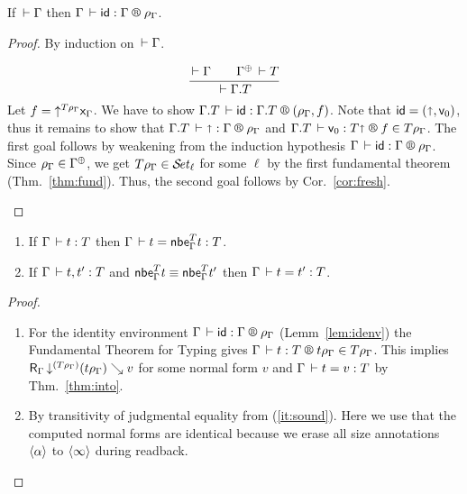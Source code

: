 \documentclass[acmlarge,review,anonymous]{acmart}\settopmatter{printfolios=true}
\begin{document}
\begin{lemma}
  \label{lem:idenv}
  If $\der \Gamma$ then
  $\LRS \Gamma \sid \Gamma \rhog$.
\end{lemma}
\begin{proof}
  By induction on $\der \Gamma$.
\begin{caselist}

\nextcase
\[
  \ru{\der \Gamma \qquad \resurrect\Gamma \der T
    }{\der \cext \Gamma T}
\]
Let $f = \up{T\rhog} \var\Gamma$.
We have to show $\LRS{\cext \Gamma T} \sid {\cext\Gamma T} {(\rhog, f)}$.
Note that $\sid = (\slift,\ind0)$, thus it remains to show that
$\LRS {\cext \Gamma T} {\slift} \Gamma \rhog$ and
$\LR {\cext \Gamma T} {\ind0} {T\slift} f {T\rhog}$.
The first goal follows by weakening from the induction hypothesis
$\LRS \Gamma \sid \Gamma \rhog$.
Since $\rhog \in \resurrect\Gamma$, we get $T \rhog \in \SET[\ell]$ for some $\ell$
by the first fundamental theorem (Thm.~\ref{thm:fund}).
Thus, the second goal follows by Cor.~\ref{cor:fresh}.

\nextcase


\end{caselist}
\end{proof}

\begin{corollary}
  \label{cor:soundnbe} \bla
  \begin{enumerate}
  \item \label{it:sound}
  If\/ $\Gamma \der t : T$ then $\Gamma \der t = \nbe \Gamma T t : T$.
  \item
  If\/ $\Gamma \der t,t' : T$ and $\nbe \Gamma T t \equiv \nbe \Gamma T {t'}$ then
  $\Gamma \der t = t' : T$.
  \end{enumerate}
\end{corollary}
\begin{proof}
  \bla
  \begin{enumerate}

  \item For the identity environment $\LRS \Gamma \sid \Gamma \rhog$ (Lemm~\ref{lem:idenv})
  the Fundamental Theorem for Typing gives $\LR \Gamma t T {t\rhog} {T\rhog}$.
  This implies $\R \Gamma {\down{(T\rhog)} (t\rhog)} v$ for some normal form $v$ and
  $\Gamma \der t = v : T$ by Thm.~\ref{thm:into}.

  \item By transitivity of judgmental equality from (\ref{it:sound}).
     Here we use that the computed normal forms are identical because
     we erase all size annotations $\ann\alpha$ to $\ann\infty$ during readback.
  \end{enumerate}
\end{proof}
\end{document}
